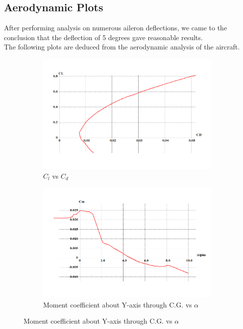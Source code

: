 \subsection{Aerodynamic Plots}
After performing analysis on numerous aileron deflections, we came to the conclusion that the deflection of 5 degrees gave reasonable results.\\
The following plots are deduced from the aerodynamic analysis of the aircraft.
\begin{figure}[H]
\begin{subfigure}{0.6\textwidth}
\includegraphics[width = \linewidth]{cl_vs_cd__2_.png}
\caption{$C_l$ vs $C_d$}
\end{subfigure}
\begin{subfigure}{0.6\textwidth}
\includegraphics[width = \linewidth]{cm_alpha__2_.png}
\caption{Moment coefficient about Y-axis through C.G. vs $\alpha$}
\end{subfigure}

\end{figure}
